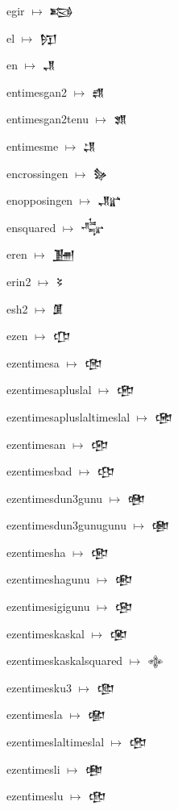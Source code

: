 {\noindent egir $\mapsto$ {\cufont 𒂕}\par
\noindent el $\mapsto$ {\cufont 𒂖}\par
\noindent en $\mapsto$ {\cufont 𒂗}\par
\noindent entimesgan2 $\mapsto$ {\cufont 𒂘}\par
\noindent entimesgan2tenu $\mapsto$ {\cufont 𒂙}\par
\noindent entimesme $\mapsto$ {\cufont 𒂚}\par
\noindent encrossingen $\mapsto$ {\cufont 𒂛}\par
\noindent enopposingen $\mapsto$ {\cufont 𒂜}\par
\noindent ensquared $\mapsto$ {\cufont 𒂝}\par
\noindent eren $\mapsto$ {\cufont 𒂞}\par
\noindent erin2 $\mapsto$ {\cufont 𒂟}\par
\noindent esh2 $\mapsto$ {\cufont 𒂠}\par
\noindent ezen $\mapsto$ {\cufont 𒂡}\par
\noindent ezentimesa $\mapsto$ {\cufont 𒂢}\par
\noindent ezentimesapluslal $\mapsto$ {\cufont 𒂣}\par
\noindent ezentimesapluslaltimeslal $\mapsto$ {\cufont 𒂤}\par
\noindent ezentimesan $\mapsto$ {\cufont 𒂥}\par
\noindent ezentimesbad $\mapsto$ {\cufont 𒂦}\par
\noindent ezentimesdun3gunu $\mapsto$ {\cufont 𒂧}\par
\noindent ezentimesdun3gunugunu $\mapsto$ {\cufont 𒂨}\par
\noindent ezentimesha $\mapsto$ {\cufont 𒂩}\par
\noindent ezentimeshagunu $\mapsto$ {\cufont 𒂪}\par
\noindent ezentimesigigunu $\mapsto$ {\cufont 𒂫}\par
\noindent ezentimeskaskal $\mapsto$ {\cufont 𒂬}\par
\noindent ezentimeskaskalsquared $\mapsto$ {\cufont 𒂭}\par
\noindent ezentimesku3 $\mapsto$ {\cufont 𒂮}\par
\noindent ezentimesla $\mapsto$ {\cufont 𒂯}\par
\noindent ezentimeslaltimeslal $\mapsto$ {\cufont 𒂰}\par
\noindent ezentimesli $\mapsto$ {\cufont 𒂱}\par
\noindent ezentimeslu $\mapsto$ {\cufont 𒂲}\par
}
